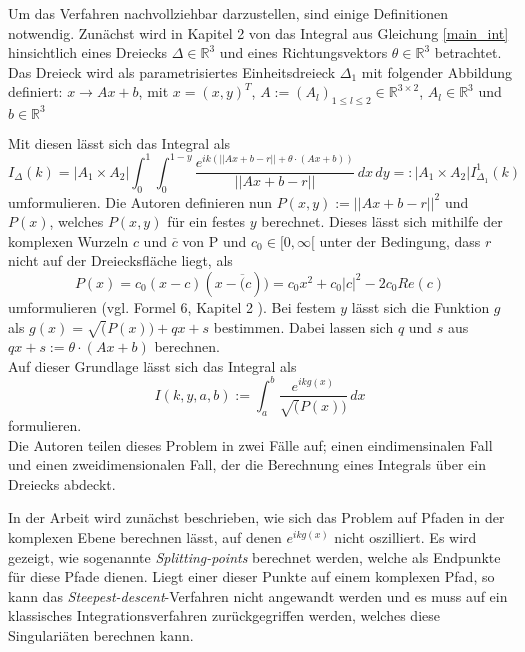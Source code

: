 Um das Verfahren nachvollziehbar darzustellen, sind einige Definitionen notwendig.
Zunächst wird in Kapitel 2 von \cite{gasperini:hal-03209144} das Integral aus Gleichung \ref{main_int} hinsichtlich eines Dreiecks $\Delta \in \mathbb{R}^3$ und eines Richtungsvektors $\theta \in \mathbb{R}^3$ betrachtet.
Das Dreieck wird als parametrisiertes Einheitsdreieck $\Delta_1$ mit folgender Abbildung definiert: $x \rightarrow Ax + b$, mit $x = (x,y)^T$, $A:= (A_l)_{1\leq l \leq 2} \in \mathbb{R}^{3\times 2}$, $A_l \in \mathbb{R}^3$ und $b \in \mathbb{R}^3$ 

Mit diesen lässt sich das Integral als
\begin{equation}
    I_{\Delta}(k) = |A_1 \times A_2 | \int_{0}^{1} \int_{0}^{1-y}  \frac{e^{ik(||Ax + b - r|| +\theta \cdot (Ax +b))}}{||Ax + b - r ||}\,dx  \,dy  =: |A_1 \times A_2 | I_{\Delta_1}^1(k)
\end{equation}\label{main_def_int}
umformulieren. Die Autoren definieren nun $P(x,y) := ||Ax+b-r||^2$ und $P(x)$, welches $P(x,y)$ für ein festes $y$ berechnet.
Dieses lässt sich mithilfe der komplexen Wurzeln $c$ und $\overline{c}$ von P und $c_0 \in [0,\infty[$ unter der Bedingung, dass $r$ nicht auf der Dreiecksfläche liegt, als 
\begin{equation}
    P(x) = c_0(x-c)(x-\overline(c))= c_0x^2+c_0|c|^2-2c_0Re(c)
\end{equation}
umformulieren (vgl. Formel 6, Kapitel 2 \cite{gasperini:hal-03209144}).
Bei festem $y$ lässt sich die Funktion $g$ als $g(x) = \sqrt(P(x)) + qx + s$ bestimmen. Dabei lassen sich $q$ und $s$ aus $qx + s := \theta \cdot(Ax+b)$ berechnen.\\

Auf dieser Grundlage lässt sich das Integral als 
\begin{equation}
    I(k,y,a,b) := \int_{a}^{b}  \frac{e^{ikg(x)}}{\sqrt(P(x))}\,dx 
\end{equation}
formulieren.\\


Die Autoren teilen dieses Problem in zwei Fälle auf; einen eindimensinalen Fall und einen zweidimensionalen Fall, der die Berechnung eines Integrals über ein Dreiecks abdeckt.


In der Arbeit \cite{gasperini:hal-03209144} wird zunächst beschrieben, wie sich das Problem auf Pfaden in der komplexen Ebene berechnen lässt, auf denen $e^{ikg(x)}$ nicht oszilliert.
Es wird gezeigt, wie sogenannte \textit{Splitting-points} berechnet werden, welche als Endpunkte für diese Pfade dienen.
Liegt einer dieser Punkte auf einem komplexen Pfad, so kann das \textit{Steepest-descent}-Verfahren nicht angewandt werden und es muss auf ein klassisches Integrationsverfahren zurückgegriffen werden, welches diese Singulariäten berechnen kann.


